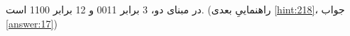 \section{}
\paragraph{}\label{hint:76}
در مبنای دو، 3 برابر 0011 و 12 برابر 1100 است. (راهنماییِ بعدی \ref{hint:218}، جواب \ref{answer:17})
